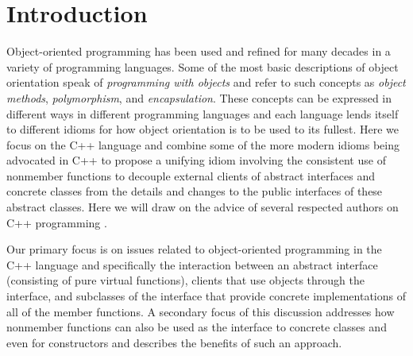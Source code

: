 \documentclass[pdf,ps2pdf,11pt]{SANDreport}
\begin{document}

%
\SANDmain %

%
\section{Introduction}
%

Object-oriented programming has been used and refined for many decades in a
variety of programming languages.  Some of the most basic descriptions of
object orientation speak of {}\textit{programming with objects} and refer to
such concepts as {}\textit{object methods}, {}\textit{polymorphism}, and
{}\textit{encapsulation}.  These concepts can be expressed in different ways
in different programming languages and each language lends itself to different
idioms for how object orientation is to be used to its fullest.  Here we focus
on the C++ language and combine some of the more modern idioms being advocated
in C++ to propose a unifying idiom involving the consistent use of nonmember
functions to decouple external clients of abstract interfaces and concrete
classes from the details and changes to the public interfaces of these
abstract classes.  Here we will draw on the advice of several respected
authors on C++ programming {}\cite{C++CodingStandards05,EffectiveC++3rd}.

Our primary focus is on issues related to object-oriented programming in the
C++ language and specifically the interaction between an abstract interface
(consisting of pure virtual functions), clients that use objects through the
interface, and subclasses of the interface that provide concrete
implementations of all of the member functions.  A secondary focus of this
discussion addresses how nonmember functions can also be used as the interface
to concrete classes and even for constructors and describes the benefits of
such an approach.
\end{document}
